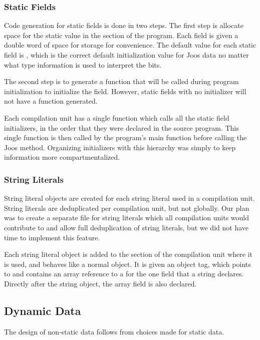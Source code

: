 \documentclass[pdftex,11pt,a4paper]{article}
\begin{document}
\subsubsection{Static Fields}

Code generation for static fields is done in two steps. The first step
is allocate space for the static value in the  section of
the program. Each field is given a double word of space for storage
for convenience. The default value for each static field is ,
which is the correct default initialization value for Joos data no
matter what type information is used to interpret the bits.

The second step is to generate a function that will be called during
program initialization to initialize the field. However, static fields
with no initializer will not have a function generated.

Each compilation unit has a single function which calls all the static
field initializers, in the order that they were declared in the source
program. This single function is then called by the program's main
function before calling the Joos  method. Organizing
initializers with this hierarchy was simply to keep information more
compartmentalized.

\subsubsection{String Literals}

String literal objects are created for each string literal used in a
compilation unit. String literals are deduplicated per compilation
unit, but not globally. Our plan was to create a separate file for
string literals which all compilation units would contribute to and
allow full deduplication of string literals, but we did not have time
to implement this feature.

Each string literal object is added to the  section of the
compilation unit where it is used, and behaves like a normal
object. It is given an object tag, which points to
 and contains an array reference to a
 for the one field that a string declares. Directly after
the string object, the array field is also declared.

\subsection{Dynamic Data}

The design of non-static data follows from choices made for static
data.
\end{document}
